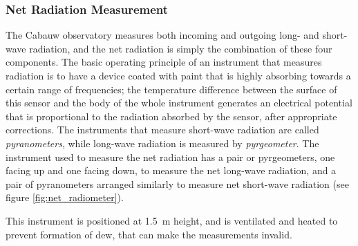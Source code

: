 \documentclass[a4paper,11pt]{kth-mag}
\begin{document}
\subsubsection{Net Radiation Measurement}
The Cabauw observatory measures both incoming and outgoing long- and short-wave radiation, and the net radiation is simply the combination of these four components. The basic operating principle of an instrument that measures radiation is to have a device coated with paint that is highly absorbing towards a certain range of frequencies; the temperature difference between the surface of this sensor and the body of the whole instrument generates an electrical potential that is proportional to the radiation absorbed by the sensor, after appropriate corrections.  The instruments that measure short-wave radiation are called \emph{pyranometers}, while long-wave radiation is measured by \emph{pyrgeometer}.  The instrument used to measure the net radiation has a pair or pyrgeometers, one facing up and one facing down, to measure the net long-wave radiation, and a pair of pyranometers arranged similarly to measure net short-wave radiation (see figure \ref{fig:net_radiometer}).

This instrument is positioned at \SI{1.5}{\meter} height, and is ventilated and heated to prevent formation of dew, that can make the measurements invalid.
\end{document}
